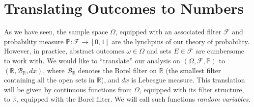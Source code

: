 \documentclass[12pt]{article}
\newcommand{\rr}{\mathbb{R}}
\newcommand{\filter}{\mathcal{F}}
\newcommand{\borel}{\mathcal{B}}
\newcommand{\prob}{\mathbb{P}}
\theoremstyle{plain}
\theoremstyle{definition}
\theoremstyle{remark}
\numberwithin{equation}{section}  %
\begin{document}
\section{Translating Outcomes to Numbers}
As we have seen, the sample space $\Omega$, equipped with an associated filter
$\filter$ and probability measure $\prob: \filter \to [0,1]$ 
are the lynchpins of our theory of probability. However, in practice,
abstract outcomes $\omega \in \Omega$ and sets $E \in \filter$ are
cumbersome to work with. We would like to ``translate'' our analysis
on $(\Omega, \filter, \prob)$ to $(\rr, \borel_{\rr}, dx)$,
where $\borel_{\rr}$ denotes the Borel filter on $\rr$ (the smallest 
filter containing all the open sets in $\rr$), and $dx$ is
Lebesgue measure. This translation will be given by continuous functions from
$\Omega$, equipped with its filter structure, to $\rr$,
equipped with the Borel filter. We will call such functions 
\emph{random variables}.
\end{document}
